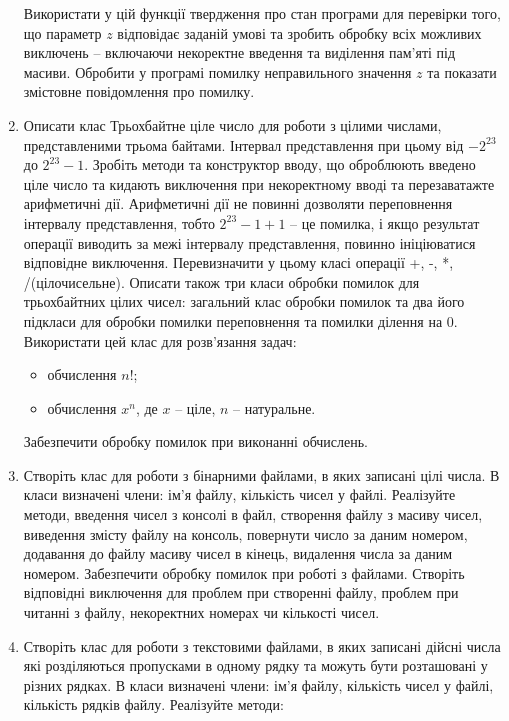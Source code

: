 \documentclass[]{article}
\begin{document}
\begin{enumerate}
  Використати у цій функції твердження про стан програми для перевірки
  того, що параметр \(z\) відповідає заданій умові та зробить обробку
  всіх можливих виключень -- включаючи некоректне введення та виділення
  пам'яті під масиви. Обробити у програмі помилку неправильного значення
  \(z\) та показати змістовне повідомлення про помилку.


\item
  Описати клас Трьохбайтне ціле число для роботи з цілими числами,
  представленими трьома байтами. Інтервал представлення при цьому від
  \(- 2^{23}\) до \(2^{23} - 1\). Зробіть методи та конструктор вводу,
  що оброблюють введено ціле число та кидають виключення при
  некоректному вводі та перезаватажте арифметичні дії. Арифметичні дії
  не повинні дозволяти переповнення інтервалу представлення, тобто
  \(2^{23} - 1 + 1\) -- це помилка, і якщо результат операції виводить
  за межі інтервалу представлення, повинно ініціюватися відповідне
  виключення. Перевизначити у цьому класі операції +, -, *,
  /(цілочисельне). Описати також три класи обробки помилок для
  трьохбайтних цілих чисел: загальний клас обробки помилок та два його
  підкласи для обробки помилки переповнення та помилки ділення на 0.
  Використати цей клас для розв'язання задач:
  \begin{itemize}
  \item
    обчислення \(n!\);
  \item
    обчислення \(x^{n}\), де \(x\) -- ціле, \(n\) -- натуральне.
  \end{itemize}

  Забезпечити обробку помилок при виконанні обчислень.

\item
  Створіть клас для роботи з бінарними файлами, в яких записані цілі
  числа. В класи визначені члени: ім'я файлу, кількість чисел у файлі.
  Реалізуйте методи, введення чисел з консолі в файл, створення файлу з
  масиву чисел, виведення змісту файлу на консоль, повернути число за
  даним номером, додавання до файлу масиву чисел в кінець, видалення
  числа за даним номером. Забезпечити обробку помилок при роботі з
  файлами. Створіть відповідні виключення для проблем при створенні
  файлу, проблем при читанні з файлу, некоректних номерах чи кількості
  чисел.
\item
  Створіть клас для роботи з текстовими файлами, в яких записані дійсні
  числа які розділяються пропусками в одному рядку та можуть бути
  розташовані у різних рядках. В класи визначені члени: ім'я файлу,
  кількість чисел у файлі, кількість рядків файлу. Реалізуйте методи:


\end{enumerate}
\end{document}
